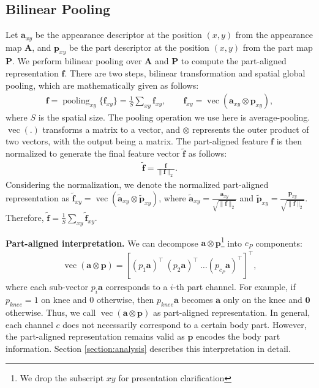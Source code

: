 \documentclass{llncs}
\begin{document}
\subsection{Bilinear Pooling}
Let $\mathbf{a}_{xy}$ be the appearance descriptor at the position $(x,y)$ from the appearance map $\mathbf{A}$, and $\mathbf{p}_{xy}$ be the part descriptor at the position $(x,y)$ from the part map $\mathbf{P}$.
We perform bilinear pooling over $\mathbf{A}$ and $\mathbf{P}$ to compute the part-aligned representation $\mathbf{f}$.
There are two steps,
bilinear transformation
and spatial global pooling,
which are mathematically given as follows:
\begin{align}
\mathbf{f} = 
\operatorname{pooling}_{xy}\{\mathbf{f}_{xy}\}
= \frac{1}{S} \sum_{xy}\mathbf{f}_{xy},
\quad\quad
\mathbf{f}_{xy} = \operatorname{vec} (\mathbf{a}_{xy}\otimes \mathbf{p}_{xy}),
\label{eqn:bilinearpooling1}
\end{align}
where $S$ is the spatial size. The pooling operation we use here is average-pooling. 
$\operatorname{vec}(.)$ transforms a matrix to a vector,
and
$\otimes$ represents the outer product of two vectors,
with the output being a matrix. 
The part-aligned feature $\mathbf{f}$ is then normalized to generate the final feature vector $\tilde{\mathbf{f}}$ as follows:
\begin{align}
\tilde{\mathbf{f}} = \frac{\mathbf{f}}{\|\mathbf{f} \|_2}.
\label{eqn:bilinearpooling2}
\end{align}
Considering the normalization, we denote the normalized part-aligned representation as
$\tilde{\mathbf{f}}_{xy} = 
\operatorname{vec}(\tilde{\mathbf{a}}_{xy}\otimes \tilde{\mathbf{p}}_{xy})$, where $\tilde{\mathbf{a}}_{xy} = \frac{\mathbf{a}_{xy}}{\sqrt{\|\mathbf{f}\|_2}}$ and  $\tilde{\mathbf{p}}_{xy} = \frac{\mathbf{p}_{xy}}{\sqrt{\|\mathbf{f}\|_2}}${\color{black}. Therefore, $\tilde{\mathbf{f}} = \frac{1}{S}\sum_{xy}{\tilde{\mathbf{f}}_{xy}}$.}

\vspace{.1cm}
\noindent\textbf{Part-aligned interpretation.}
We can decompose $\mathbf{a} \otimes \mathbf{p}$\footnote{We drop the subscript $xy$
for presentation clarification}
into $c_P$ components:
\begin{align}
\operatorname{vec}(\mathbf{a} \otimes \mathbf{p})
=
[(p_1\mathbf{a})^\top~
(p_2\mathbf{a})^\top~ 
\dots
(p_{c_P}\mathbf{a})^\top]^\top,
\label{eq:pose_aligned}
\end{align}
where each sub-vector $p_i \mathbf{a}$ corresponds to a $i$-th part channel. For example, if $p_{knee}=1$ on knee and $0$ otherwise, then $p_{knee} \mathbf{a}$ becomes $\mathbf{a}$ only on the knee and $\mathbf{0}$ otherwise. Thus, we call $\operatorname{vec}(\mathbf{a}\otimes\mathbf{p})$ as part-aligned representation. In general, each channel $c$ does not necessarily correspond to a certain body part. However, the part-aligned representation remains valid as $\mathbf{p}$ encodes the body part information. Section {\ref{section:analysis}} describes this interpretation in detail.
\end{document}
